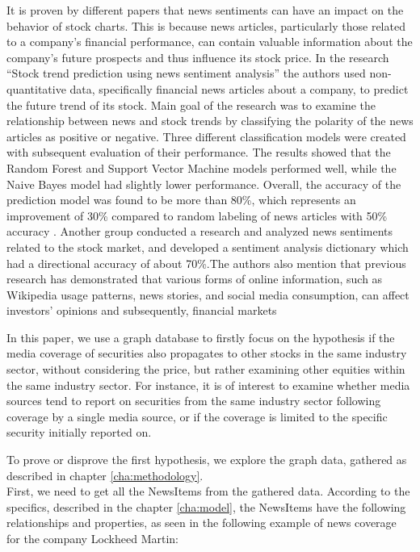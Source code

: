 It is proven by different papers that news sentiments can have an impact on the behavior of stock charts. This is because news articles, particularly those related to a company's financial performance, can contain valuable information about the company's future prospects and thus influence its stock price. In the research “Stock trend prediction using news sentiment analysis” \cite{kalyani2016stock} the authors used non-quantitative data, specifically financial news articles about a company, to predict the future trend of its stock. Main goal of the research was to examine the relationship between news and stock trends by classifying the polarity of the news articles as positive or negative. Three different classification models were created with subsequent evaluation of their performance. The results showed that the Random Forest and Support Vector Machine models performed well, while the Naive Bayes model had slightly lower performance. Overall, the accuracy of the prediction model was found to be more than 80\%, which represents an improvement of 30\% compared to random labeling of news articles with 50\% accuracy \cite{kalyani2016stock}. 
Another group conducted a research and analyzed news sentiments related to the stock market, and developed a sentiment analysis dictionary which had a directional accuracy of about 70\%.The authors also mention that previous research has demonstrated that various forms of online information, such as Wikipedia usage patterns, news stories, and social media consumption, can affect investors' opinions and subsequently, financial markets \cite{1812041948:online}

\newpage
In this paper, we use a graph database to firstly focus on the hypothesis if the media coverage of securities also propagates to other stocks in the same industry sector, without considering the price, but rather examining other equities within the same industry sector.  For instance, it is of interest to examine whether media sources tend to report on securities from the same industry sector following coverage by a single media source, or if the coverage is limited to the specific security initially reported on.


\noindent To prove or disprove the first hypothesis, we explore the graph data, gathered as described in chapter \ref{cha:methodology}.\\
First, we need to get all the NewsItems from the gathered data. According to the specifics, described in the chapter \ref{cha:model}, the NewsItems have the following relationships and properties, as seen in the following example of news coverage for the company Lockheed Martin:

